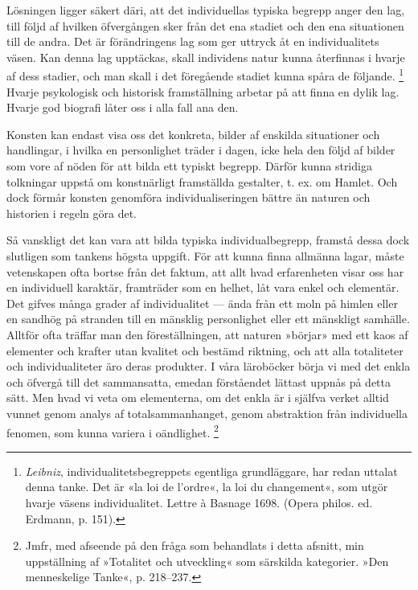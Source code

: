 \documentclass[12pt]{article}
\newcommand{\opage}[1]{\marginnote{\footnotesize\textit{[#1]}}}
\begin{document}
Lösningen ligger säkert däri, att det individuellas typiska begrepp anger den lag, till följd af hvilken öfvergången sker %
\opage{25}
från det ena stadiet och den ena situationen till de andra. Det är förändringens lag som ger uttryck åt en individualitets väsen. Kan denna lag upptäckas, skall individens natur kunna återfinnas i hvarje af dess stadier, och man skall i det föregående stadiet kunna spåra de följande. %
\footnote[1]{\textit{Leibniz}, individualitetsbegreppets egentliga grundläggare, har redan uttalat denna tanke. Det är «la %
loi de l'ordre«, la loi du changement«, som utgör hvarje väsens individualitet. Lettre à Basnage 1698. (Opera philos. ed. Erdmann, p. 151).} Hvarje psykologisk och historisk framställning arbetar på att finna en dylik lag. Hvarje god biografi låter oss i alla fall ana den. 

Konsten kan endast visa oss det konkreta, bilder af enskilda situationer och handlingar, i hvilka en personlighet träder i dagen, icke hela den följd af bilder som vore af nöden för att bilda ett typiskt begrepp. Därför kunna stridiga tolkningar uppstå om konstnärligt framställda gestalter, t. ex. om Hamlet. Och dock förmår konsten genomföra individualiseringen bättre än naturen och historien i regeln göra det.

Så vanskligt det kan vara att bilda typiska individualbegrepp, framstå dessa %
\opage{26}
dock slutligen som tankens högsta uppgift. För att kunna finna allmänna lagar, måste vetenskapen ofta bortse från det faktum, att allt hvad erfarenheten visar oss har en individuell karaktär, framträder som en helhet, låt vara enkel och elementär. Det gifves många grader af individualitet --- ända från ett moln på himlen eller en sandhög på stranden till en mänsklig personlighet eller ett mänskligt samhälle. Alltför ofta träffar man den föreställningen, att naturen »börjar» med ett kaos af elementer och krafter utan kvalitet och bestämd riktning, och att alla totaliteter och individualiteter äro deras produkter. I våra läroböcker börja vi med det enkla och öfvergå till det sammansatta, emedan förståendet lättast uppnås på detta sätt. Men hvad vi veta om elementerna, om det enkla är i själfva verket alltid vunnet genom analys af totalsammanhanget, genom abstraktion från individuella fenomen, som kunna variera i oändlighet. %
\footnote[1]{Jmfr, med afseende på den fråga som behandlats i detta afsnitt, min uppställning af »Totalitet och utveckling« som särskilda kategorier. »Den menneskelige Tanke«, p. 218--237.}
\end{document}
